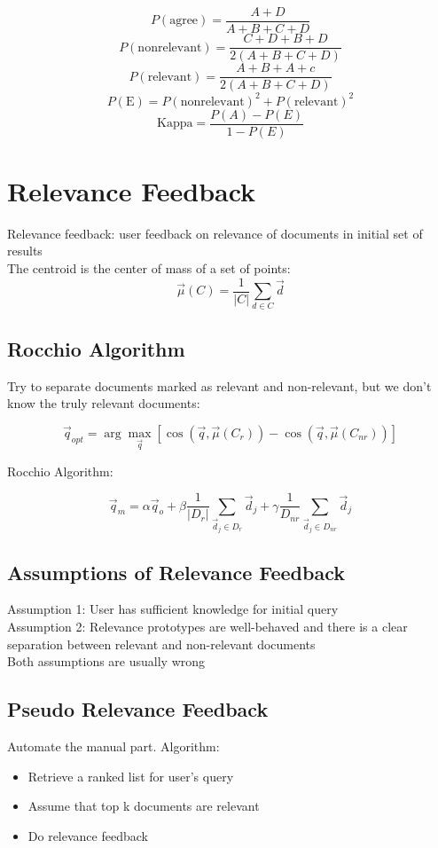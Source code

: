 \begin{multicols*}{2}
$$P(\text{agree}) = \frac{A+D}{A+B+C+D}$$
$$P(\text{nonrelevant}) = \frac{C + D + B +D}{2(A+B+C+D)}$$
$$P(\text{relevant}) = \frac{A+B+A+c}{2(A+B+C+D)}$$
$$P(\text{E}) = P(\text{nonrelevant})^2 + P(\text{relevant})^2$$
$$\text{Kappa}=\frac{P(A)-P(E)}{1-P(E)}$$

\section{Relevance Feedback}

\noindent Relevance feedback: user feedback on relevance of documents in initial set of results \\

\noindent The centroid is the center of mass of a set of points:
$$\vec{\mu}(C)=\frac{1}{|C|} \sum_{d\in C} \vec{d}$$

\subsection{Rocchio Algorithm}
\noindent Try to separate documents marked as relevant and non-relevant, but we don’t know the truly relevant documents:

$$\vec{q}_{opt}=\arg\!\max_{\vec{q}}[ \cos(\vec{q},\vec{\mu}(C_r)) - \cos(\vec{q},\vec{\mu}(C_{nr}))]$$

\noindent Rocchio Algorithm:

$$\vec{q}_m = \alpha \vec{q}_o + \beta \frac{1}{|D_r|} \sum_{\vec{d}_j \in D_r} \vec{d}_j + \gamma \frac{1}{D_{nr}} \sum_{\vec{d}_j \in D_{nr}} \vec{d}_j$$

\subsection{Assumptions of Relevance Feedback}

\noindent Assumption 1: User has sufficient knowledge for initial query \\

\noindent Assumption 2: Relevance prototypes are well-behaved and there is a clear separation between relevant and non-relevant documents\\

\noindent Both assumptions are usually wrong

\subsection{Pseudo Relevance Feedback}
Automate the manual part. Algorithm:
\begin{itemize}
    \item Retrieve a ranked list for user’s query
    \item Assume that top k documents are relevant
    \item Do relevance feedback
\end{itemize}


\end{multicols*}
